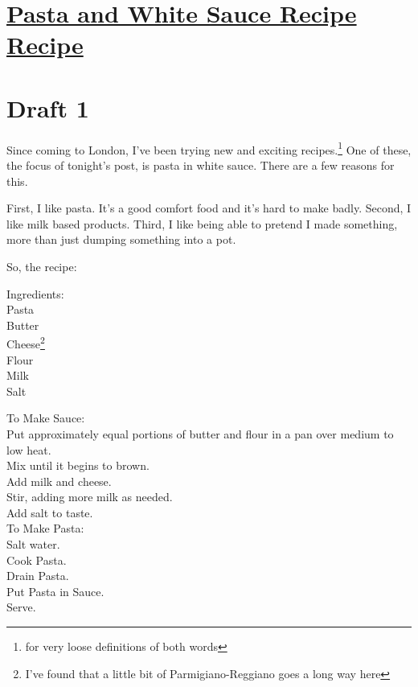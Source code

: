 \documentclass[12pt]{article}[titlepage]
\newcommand{\1}{\={a}}
\newcommand{\2}{\={e}}
\newcommand{\3}{\={\i}}
\newcommand{\4}{\=o}
\newcommand{\5}{\=u}
\newcommand{\6}{\={A}}
\renewcommand{\,}{\textsuperscript{,}}
\begin{document}
\doublespacing
\section{\href{pasta-and-white-sauce.html}{Pasta and White Sauce Recipe Recipe}}

\section{Draft 1}
Since coming to London, I've been trying new and exciting recipes.\footnote{for very loose definitions of both words}
One of these, the focus of tonight's post, is pasta in white sauce.
There are a few reasons for this.

First, I like pasta.
It's a good comfort food and it's hard to make badly.
Second, I like milk based products.
Third, I like being able to pretend I made something, more than just dumping something into a pot.

So, the recipe:

Ingredients:\\
Pasta\\
Butter\\
Cheese\footnote{I've found that a little bit of Parmigiano-Reggiano goes a long way here}\\
Flour\\
Milk\\
Salt

To Make Sauce:\\
Put approximately equal portions of butter and flour in a pan over medium to low heat.\\
Mix until it begins to brown.\\
Add milk and cheese.\\
Stir, adding more milk as needed.\\
Add salt to taste.\\

To Make Pasta:\\
Salt water.\\
Cook Pasta.\\
Drain Pasta.\\
Put Pasta in Sauce.\\
Serve.\\
\end{document}

